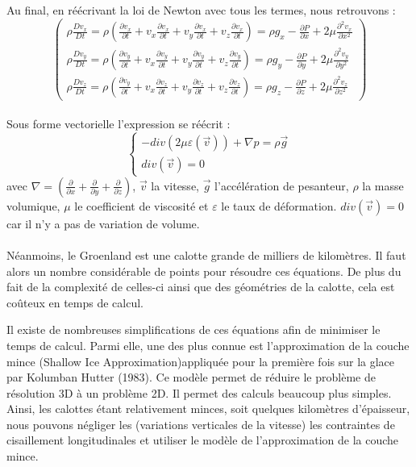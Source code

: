 \documentclass{article}
\begin{document}
\\\\
Au final, en réécrivant la loi de Newton avec tous les termes, nous retrouvons :
\begin{equation}
\left(
\begin{array}{l}
\rho \frac{D v_{x}}{Dt} = \rho(\frac{\partial v_{x}}{\partial t} + v_{x} \frac{\partial v_{x}}{\partial t} + v_{y} \frac{\partial v_{x}}{\partial t} + v_{z} \frac{\partial v_{x}}{\partial t}) = \rho g_{x} - \frac{\partial P}{\partial x} + 2\mu \frac{\partial^2v_{x}}{\partial x^2}  \\
\rho \frac{D v_{y}}{Dt} = \rho(\frac{\partial v_{y}}{\partial t} + v_{x} \frac{\partial v_{y}}{\partial t} + v_{y} \frac{\partial v_{y}}{\partial t} + v_{z} \frac{\partial v_{y}}{\partial t}) =  \rho g_{y} - \frac{\partial P}{\partial y} + 2\mu \frac{\partial^2v_{y}}{\partial y^2} \\
\rho \frac{D v_{z}}{Dt} = \rho(\frac{\partial v_{y}}{\partial t} + v_{x} \frac{\partial v_{z}}{\partial t} + v_{y} \frac{\partial v_{z}}{\partial t} + v_{z} \frac{\partial v_{z}}{\partial t}) = \rho g_{z} - \frac{\partial P}{\partial z} + 2\mu \frac{\partial^2v_{z}}{\partial z^2}
\end{array}
\right)
\end{equation}
\\
Sous forme vectorielle l'expression se réécrit : 
\begin{equation}
\left\{
\begin{array}{l}
-div(2 \mu \varepsilon(\vec{v})) + \nabla p = \rho \vec{g} \\
div(\vec{v}) = 0 \qquad
\end{array}
\right.
\label{eq1}
\end{equation}
avec $\nabla = ( \frac{\partial}{\partial x} + \frac{\partial}{\partial y} + \frac{\partial}{\partial z})$, $\vec{v}$ la vitesse, $\vec{g}$ l'accélération de pesanteur, $\rho$ la masse volumique, $\mu$ le coefficient de viscosité et $\varepsilon$ le taux de déformation. $div(\vec{v}) = 0$ car il n'y a pas de variation de volume.
\\\\
Néanmoins, le Groenland est une calotte grande de milliers de kilomètres. Il faut alors un nombre considérable de points pour résoudre ces équations. De plus du fait de la complexité de celles-ci ainsi que des géométries de la calotte, cela est coûteux en temps de calcul. 


Il existe de nombreuses simplifications de  ces équations afin de minimiser le temps de calcul. Parmi elle, une des plus connue est l'approximation de la couche mince (Shallow Ice Approximation)appliquée pour la première fois sur la glace par Kolumban Hutter (1983). Ce modèle permet de réduire le problème de résolution 3D à un problème 2D. Il permet des calculs beaucoup plus simples. Ainsi, les calottes étant relativement minces, soit quelques kilomètres d'épaisseur, nous pouvons négliger les (variations verticales de la vitesse) les contraintes de cisaillement longitudinales et utiliser le modèle de l'approximation de la couche mince.
\end{document}
